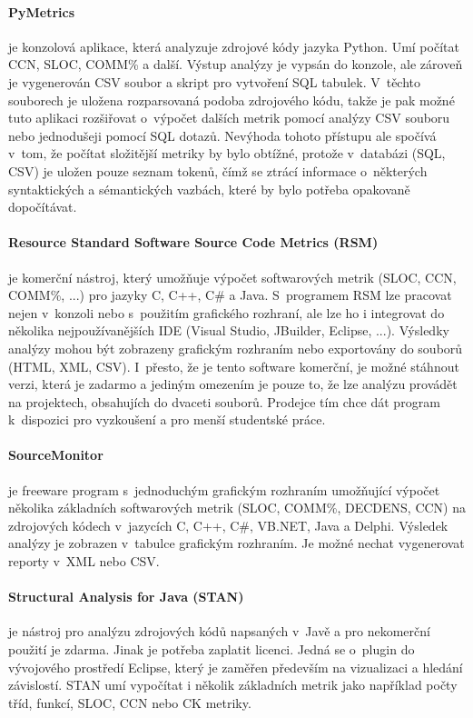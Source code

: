\documentclass[11pt,twoside,a4paper]{book}
\begin{document}
\paragraph{PyMetrics}\cite{PyMetrics} je konzolová aplikace, která analyzuje zdrojové kódy jazyka Python. Umí počítat CCN, SLOC, COMM\% a další.
Výstup analýzy je vypsán do konzole, ale zároveň je vygenerován CSV soubor a skript pro vytvoření SQL tabulek. V~těchto souborech
je uložena rozparsovaná podoba zdrojového kódu, takže je pak možné tuto aplikaci rozšiřovat o~výpočet dalších metrik pomocí
analýzy CSV souboru nebo jednodušeji pomocí SQL dotazů. Nevýhoda tohoto přístupu ale spočívá v~tom, že počítat složitější metriky by bylo
obtížné, protože v~databázi (SQL, CSV) je uložen pouze seznam tokenů, čímž se ztrácí informace o~některých syntaktických a sémantických vazbách, které
by bylo potřeba opakovaně dopočítávat.

\paragraph{Resource Standard Software Source Code Metrics (RSM)}\cite{RSM} je komerční nástroj, který umožňuje výpočet softwarových metrik
(SLOC, CCN, COMM\%, ...) pro jazyky C, C++, C\# a Java. S~programem RSM lze pracovat nejen v~konzoli nebo s~použitím
grafického rozhraní, ale lze ho i integrovat do několika nejpoužívanějších IDE (Visual Studio, JBuilder, Eclipse, ...).
Výsledky analýzy mohou být zobrazeny grafickým rozhraním nebo exportovány do souborů (HTML, XML, CSV).
I~přesto, že je tento software komerční, je možné stáhnout verzi, která je zadarmo a jediným omezením je pouze to, že lze analýzu
provádět na projektech, obsahujích do dvaceti souborů. Prodejce tím chce dát program k~dispozici pro vyzkoušení a pro menší studentské práce.

\paragraph{SourceMonitor}\cite{SourceMonitor} je freeware program s~jednoduchým grafickým rozhraním umožňující výpočet několika základních softwarových metrik
(SLOC, COMM\%, DECDENS, CCN) na zdrojových kódech v~jazycích C, C++, C\#, VB.NET, Java a Delphi. Výsledek analýzy je zobrazen v~tabulce
grafickým rozhraním. Je možné nechat vygenerovat reporty v~XML nebo CSV.

\paragraph{Structural Analysis for Java (STAN)}\cite{STAN} je nástroj pro analýzu zdrojových kódů napsaných v~Javě a pro nekomerční použití je zdarma. Jinak je potřeba
zaplatit licenci. Jedná se o~plugin do vývojového prostředí Eclipse, který je zaměřen především na vizualizaci a hledání závislostí. STAN umí vypočítat i několik
základních metrik jako například počty tříd, funkcí, SLOC, CCN nebo CK metriky.
\end{document}
